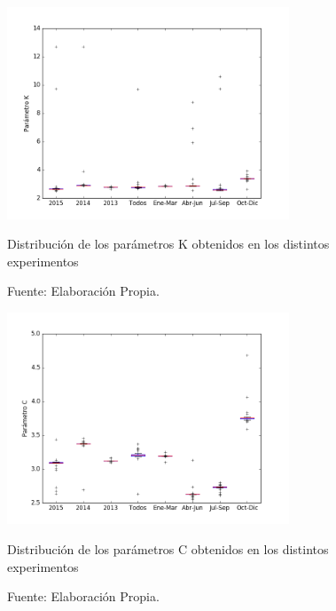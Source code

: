 \begin{figure}[ht!]
    \centering
    \captionsetup{justification=centering,margin=2cm}
    \includegraphics[width=0.75\textwidth]{figures/bp_param_K.png}
    \caption{Distribución de los parámetros K obtenidos en los distintos experimentos}
    \vspace{-.25cm}
    \caption*{Fuente: Elaboración Propia.}
    \label{fig:bp_param_K}
\end{figure}
\begin{figure}[ht!]
    \centering
    \captionsetup{justification=centering,margin=2cm}
    \includegraphics[width=0.75\textwidth]{figures/bp_param_C.png}
    \caption{Distribución de los parámetros C obtenidos en los distintos experimentos}
    \vspace{-.25cm}
    \caption*{Fuente: Elaboración Propia.}
    \label{fig:bp_param_C}
\end{figure}        

\newpage
